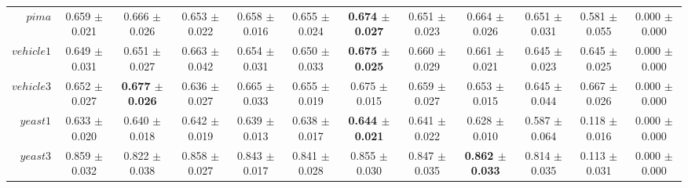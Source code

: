 \begin{table}[!ht]
{\begin{tabular}{r c c c c c c c c c c c}
$pima$ & 0.659 $\pm$ 0.021 & 0.666 $\pm$ 0.026 & 0.653 $\pm$ 0.022 & 0.658 $\pm$ 0.016 & 0.655 $\pm$ 0.024 & \textbf{0.674 $\pm$ 0.027} & 0.651 $\pm$ 0.023 & 0.664 $\pm$ 0.026 & 0.651 $\pm$ 0.031 & 0.581 $\pm$ 0.055 & 0.000 $\pm$ 0.000 \\
$vehicle1$ & 0.649 $\pm$ 0.031 & 0.651 $\pm$ 0.027 & 0.663 $\pm$ 0.042 & 0.654 $\pm$ 0.031 & 0.650 $\pm$ 0.033 & \textbf{0.675 $\pm$ 0.025} & 0.660 $\pm$ 0.029 & 0.661 $\pm$ 0.021 & 0.645 $\pm$ 0.023 & 0.645 $\pm$ 0.025 & 0.000 $\pm$ 0.000 \\
$vehicle3$ & 0.652 $\pm$ 0.027 & \textbf{0.677 $\pm$ 0.026} & 0.636 $\pm$ 0.027 & 0.665 $\pm$ 0.033 & 0.655 $\pm$ 0.019 & 0.675 $\pm$ 0.015 & 0.659 $\pm$ 0.027 & 0.653 $\pm$ 0.015 & 0.645 $\pm$ 0.044 & 0.667 $\pm$ 0.026 & 0.000 $\pm$ 0.000 \\
$yeast1$ & 0.633 $\pm$ 0.020 & 0.640 $\pm$ 0.018 & 0.642 $\pm$ 0.019 & 0.639 $\pm$ 0.013 & 0.638 $\pm$ 0.017 & \textbf{0.644 $\pm$ 0.021} & 0.641 $\pm$ 0.022 & 0.628 $\pm$ 0.010 & 0.587 $\pm$ 0.064 & 0.118 $\pm$ 0.016 & 0.000 $\pm$ 0.000 \\
$yeast3$ & 0.859 $\pm$ 0.032 & 0.822 $\pm$ 0.038 & 0.858 $\pm$ 0.027 & 0.843 $\pm$ 0.017 & 0.841 $\pm$ 0.028 & 0.855 $\pm$ 0.030 & 0.847 $\pm$ 0.035 & \textbf{0.862 $\pm$ 0.033} & 0.814 $\pm$ 0.035 & 0.113 $\pm$ 0.031 & 0.000 $\pm$ 0.000 \\
\end{tabular}}
\end{table}

